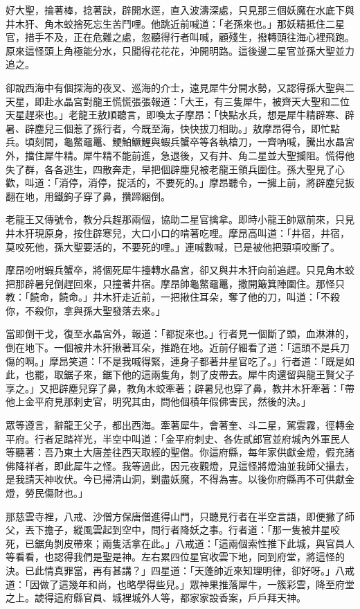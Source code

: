 好大聖，掄著棒，捻著訣，辟開水逕，直入波濤深處，只見那三個妖魔在水底下與井木犴、角木蛟捨死忘生苦鬥哩。他跳近前喊道：「老孫來也。」那妖精抵住二星官，措手不及，正在危難之處，忽聽得行者叫喊，顧殘生，撥轉頭往海心裡飛跑。原來這怪頭上角極能分水，只聞得花花花，沖開明路。這後邊二星官並孫大聖並力追之。

卻說西海中有個探海的夜叉、巡海的介士，遠見犀牛分開水勢，又認得孫大聖與二天星，即赴水晶宮對龍王慌慌張張報道：「大王，有三隻犀牛，被齊天大聖和二位天星趕來也。」老龍王敖順聽言，即喚太子摩昂：「快點水兵，想是犀牛精辟寒、辟暑、辟塵兒三個惹了孫行者，今既至海，快快拔刀相助。」敖摩昂得令，即忙點兵。頃刻間，龜鱉黿鼉、鯁鮊鱖鯉與蝦兵蟹卒等各執槍刀，一齊吶喊，騰出水晶宮外，擋住犀牛精。犀牛精不能前進，急退後，又有井、角二星並大聖攔阻。慌得他失了群，各各逃生，四散奔走，早把個辟塵兒被老龍王領兵圍住。孫大聖見了心歡，叫道：「消停，消停，捉活的，不要死的。」摩昂聽令，一擁上前，將辟塵兒扳翻在地，用鐵鉤子穿了鼻，攢蹄綑倒。

老龍王又傳號令，教分兵趕那兩個，協助二星官擒拿。即時小龍王帥眾前來，只見井木犴現原身，按住辟寒兒，大口小口的啃著吃哩。摩昂高叫道：「井宿，井宿，莫咬死他，孫大聖要活的，不要死的哩。」連喊數喊，已是被他把頸項咬斷了。

摩昂吩咐蝦兵蟹卒，將個死犀牛擡轉水晶宮，卻又與井木犴向前追趕。只見角木蛟把那辟暑兒倒趕回來，只撞著井宿。摩昂帥龜鱉黿鼉，撒開簸箕陣圍住。那怪只教：「饒命，饒命。」井木犴走近前，一把揪住耳朵，奪了他的刀，叫道：「不殺你，不殺你，拿與孫大聖發落去來。」

當即倒干戈，復至水晶宮外，報道：「都捉來也。」行者見一個斷了頭，血淋淋的，倒在地下。一個被井木犴揪著耳朵，推跪在地。近前仔細看了道：「這頭不是兵刀傷的啊。」摩昂笑道：「不是我喊得緊，連身子都著井星官吃了。」行者道：「既是如此，也罷，取鋸子來，鋸下他的這兩隻角，剝了皮帶去。犀牛肉還留與龍王賢父子享之。」又把辟塵兒穿了鼻，教角木蛟牽著；辟暑兒也穿了鼻，教井木犴牽著：「帶他上金平府見那刺史官，明究其由，問他個積年假佛害民，然後的決。」

眾等遵言，辭龍王父子，都出西海。牽著犀牛，會著奎、斗二星，駕雲霧，徑轉金平府。行者足踏祥光，半空中叫道：「金平府刺史、各佐貳郎官並府城內外軍民人等聽著：吾乃東土大唐差往西天取經的聖僧。你這府縣，每年家供獻金燈，假充諸佛降祥者，即此犀牛之怪。我等過此，因元夜觀燈，見這怪將燈油並我師父攝去，是我請天神收伏。今已掃清山洞，剿盡妖魔，不得為害。以後你府縣再不可供獻金燈，勞民傷財也。」

那慈雲寺裡，八戒、沙僧方保唐僧進得山門，只聽見行者在半空言語，即便撇了師父，丟下擔子，縱風雲起到空中，問行者降妖之事。行者道：「那一隻被井星咬死，已鋸角剝皮帶來；兩隻活拿在此。」八戒道：「這兩個索性推下此城，與官員人等看看，也認得我們是聖是神。左右累四位星官收雲下地，同到府堂，將這怪的決。已此情真罪當，再有甚講？」四星道：「天蓬帥近來知理明律，卻好呀。」八戒道：「因做了這幾年和尚，也略學得些兒。」眾神果推落犀牛，一簇彩雲，降至府堂之上。諕得這府縣官員、城裡城外人等，都家家設香案，戶戶拜天神。

